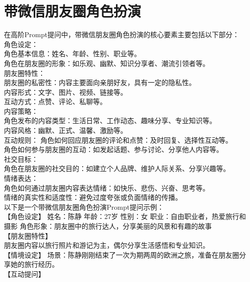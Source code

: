\documentclass[12pt]{book}
\begin{document}
\section{带微信朋友圈角色扮演}
在高阶Prompt提问中，带微信朋友圈角色扮演的核心要素主要包括以下部分：\\

角色设定：\\
角色基本信息：姓名、年龄、性别、职业等。\\
角色在朋友圈的形象：如乐观、幽默、知识分享者、潮流引领者等。\\
朋友圈特性：\\
朋友圈的私密性：内容主要面向亲朋好友，具有一定的隐私性。\\
内容形式：文字、图片、视频、链接等。\\
互动方式：点赞、评论、私聊等。\\
内容策略：\\
角色发布的内容类型：生活日常、工作动态、趣味分享、专业知识等。\\
内容风格：幽默、正式、温馨、激励等。\\
互动规则：
角色如何回应朋友圈的评论和点赞：及时回复、选择性互动等。\\
角色如何参与朋友圈的互动：如发起话题、参与讨论、分享他人内容等。\\
社交目标：\\
角色在朋友圈的社交目的：如建立个人品牌、维护人际关系、分享兴趣等。\\
情绪表达：\\
角色如何通过朋友圈内容表达情绪：如快乐、悲伤、兴奋、思考等。\\
情绪的真实性和适度性：避免过度夸张或负面情绪的传播。\\
以下是一个带微信朋友圈角色扮演Prompt提问示例：\\

【角色设定】 姓名：陈静 年龄：27岁 性别：女 职业：自由职业者，热爱旅行和摄影 角色形象：朋友圈中的旅行达人，分享美丽的风景和有趣的故事\\

【朋友圈特性】\\

朋友圈内容以旅行照片和游记为主，偶尔分享生活感悟和专业知识。\\
【情境设定】 场景：陈静刚刚结束了一次为期两周的欧洲之旅，准备在朋友圈分享她的旅行经历。\\

【互动提问】\\
\end{document}
